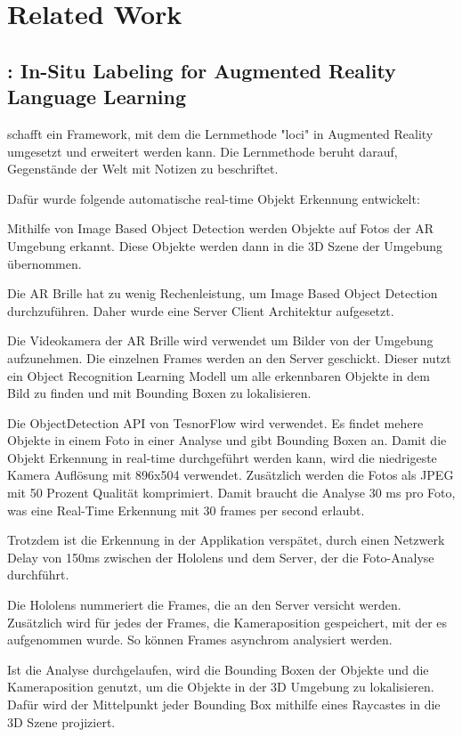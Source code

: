 \section{Related Work}

\subsection{\cite{LabelingLanguageLearning}: In-Situ Labeling for Augmented Reality Language Learning}
\cite{LabelingLanguageLearning} schafft ein Framework, mit dem die Lernmethode "loci" in Augmented Reality umgesetzt und erweitert werden kann. Die Lernmethode beruht darauf, Gegenstände der Welt mit Notizen zu beschriftet. 

Dafür wurde folgende automatische real-time Objekt Erkennung entwickelt:

Mithilfe von Image Based Object Detection werden Objekte auf Fotos der AR Umgebung erkannt. Diese Objekte werden dann in die 3D Szene der Umgebung übernommen. 

Die AR Brille hat zu wenig Rechenleistung, um Image Based Object Detection durchzuführen. Daher wurde eine Server Client Architektur aufgesetzt.

Die Videokamera der AR Brille wird verwendet um Bilder von der Umgebung aufzunehmen. Die einzelnen Frames werden an den Server geschickt. Dieser nutzt ein Object Recognition Learning Modell um alle erkennbaren Objekte in dem Bild zu finden und mit Bounding Boxen zu lokalisieren.

Die ObjectDetection API von TesnorFlow wird verwendet. Es findet mehere Objekte in einem Foto in einer Analyse und gibt Bounding Boxen an. Damit die Objekt Erkennung in real-time durchgeführt werden kann, wird die niedrigeste Kamera Auflösung mit 896x504 verwendet. Zusätzlich werden die Fotos als JPEG mit 50 Prozent Qualität komprimiert. Damit braucht die Analyse 30 ms pro Foto, was eine Real-Time Erkennung mit 30 frames per second erlaubt. 

Trotzdem ist die Erkennung in der Applikation verspätet, durch einen Netzwerk Delay von 150ms zwischen der Hololens und dem Server, der die Foto-Analyse durchführt.

Die Hololens nummeriert die Frames, die an den Server versicht werden. Zusätzlich wird für jedes der Frames, die Kameraposition gespeichert, mit der es aufgenommen wurde. So können Frames asynchrom analysiert werden. 

Ist die Analyse durchgelaufen, wird die Bounding Boxen der Objekte und die Kameraposition genutzt, um die Objekte in der 3D Umgebung zu lokalisieren. Dafür wird der Mittelpunkt jeder Bounding Box mithilfe eines Raycastes in die 3D Szene projiziert.

